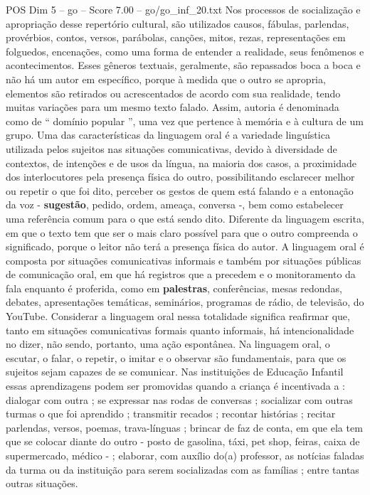 \begin{textsample}{POS Dim 5 – go – Score 7.00 – go/go\_inf\_20.txt}
Nos processos de socialização e apropriação desse repertório cultural, são utilizados causos, fábulas, parlendas, provérbios, contos, versos, parábolas, canções, mitos, rezas, representações em folguedos, encenações, como uma forma de entender a realidade, seus fenômenos e acontecimentos.
Esses gêneros textuais, geralmente, são repassados boca a boca e não há um autor em específico, porque à medida que o outro se apropria, elementos são retirados ou acrescentados de acordo com sua realidade, tendo muitas variações para um mesmo texto falado.
Assim, autoria é denominada como de “ domínio popular ”, uma vez que pertence à memória e à cultura de um grupo.
Uma das características da linguagem oral é a variedade linguística utilizada pelos sujeitos nas situações comunicativas, devido à diversidade de contextos, de intenções e de usos da língua, na maioria dos casos, a proximidade dos interlocutores pela presença física do outro, possibilitando esclarecer melhor ou repetir o que foi dito, perceber os gestos de quem está falando e a entonação da voz - \textbf{sugestão}, pedido, ordem, ameaça, conversa -, bem como estabelecer uma referência comum para o que está sendo dito.
Diferente da linguagem escrita, em que o texto tem que ser o mais claro possível para que o outro compreenda o significado, porque o leitor não terá a presença física do autor.
A linguagem oral é composta por situações comunicativas informais e também por situações públicas de comunicação oral, em que há registros que a precedem e o monitoramento da fala enquanto é proferida, como em \textbf{palestras}, conferências, mesas redondas, debates, apresentações temáticas, seminários, programas de rádio, de televisão, do YouTube.
Considerar a linguagem oral nessa totalidade significa reafirmar que, tanto em situações comunicativas formais quanto informais, há intencionalidade no dizer, não sendo, portanto, uma ação espontânea.
Na linguagem oral, o escutar, o falar, o repetir, o imitar e o observar são fundamentais, para que os sujeitos sejam capazes de se comunicar.
Nas instituições de Educação Infantil essas aprendizagens podem ser promovidas quando a criança é incentivada a : dialogar com outra ; se expressar nas rodas de conversas ; socializar com outras turmas o que foi aprendido ; transmitir recados ; recontar histórias ; recitar parlendas, versos, poemas, trava-línguas ; brincar de faz de conta, em que ela tem que se colocar diante do outro - posto de gasolina, táxi, pet shop, feiras, caixa de supermercado, médico - ; elaborar, com auxílio do(a) professor, as notícias faladas da turma ou da instituição para serem socializadas com as famílias ; entre tantas outras situações.

\end{textsample}
